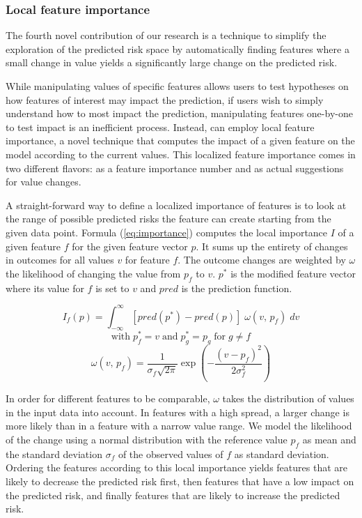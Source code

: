 \subsubsection{Local feature importance}
The fourth novel contribution of our research is a technique to simplify the
exploration of the predicted risk space by automatically finding features where a small change in value yields a significantly large change on the predicted risk.

While manipulating values of specific features allows users to test hypotheses on how features of interest may impact the prediction, if users wish to simply understand how to most impact the prediction, manipulating features one-by-one to test impact is an inefficient process.  Instead, \prospector can employ local feature importance, a novel technique that computes the impact of a given feature on the model according to the current values.  This localized feature importance comes in two different flavors: as a feature importance number and as actual suggestions for value changes.

A straight-forward way to define a localized importance of features is to look at the range of possible
predicted risks the feature can create starting from the given data point.
Formula (\ref{eq:importance}) computes the local importance $I$ of a given feature $f$ for the given feature
vector $p$. It sums up the entirety of changes in outcomes for all values $v$ for feature $f$.
The outcome changes are weighted by $\omega$ the likelihood of changing the value from $p_f$ to $v$.
$p^{\ast}$ is the modified feature vector where its value for $f$ is set to $v$ and $pred$ is the prediction function.

\begin{equation}
I_{f}(p) = \int_{-\infty}^{\infty}
\left[ pred(p^{\ast}) - pred(p) \right] \; \omega(v, \, p_f) \; dv
\label{eq:importance}
\end{equation}%
\[
\text{with}\; p^{\ast}_{f} = v \;\text{and}\; p^{\ast}_{g} = p_{g} \;\text{for}\; g \neq f
\]\[
\omega(v, \, p_f) = \frac{1}{\sigma_f \sqrt{2\pi}}
\exp \left( -\frac{(v - p_f)^2}{2\sigma_f^2} \right)
\]

In order for different features to be comparable, $\omega$ takes the distribution of values in the input data
into account. In features with a high spread, a larger change is more likely than in a feature with a narrow value range.
We model the likelihood of the change using a normal distribution with the reference value $p_f$ as mean and the
standard deviation $\sigma_f$ of the observed values of $f$ as standard deviation.
Ordering the features according to this local importance yields features that are likely to
decrease the predicted risk first, then features that have a low impact on the predicted risk,
and finally features that are likely to increase the predicted risk.

